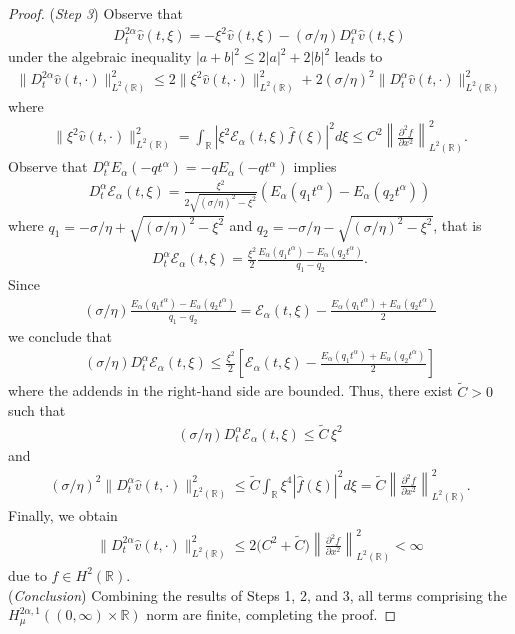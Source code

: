 \documentclass[10pt,a4paper]{amsart}
\begin{document}
\begin{proof}
({\it Step 3})
Observe that
\begin{align*}
D^{2\alpha}_t \hat{v}(t, \xi) = -\xi^2 \hat{v}(t, \xi) - (\sigma/\eta) D^\alpha_t \hat{v}(t, \xi)
\end{align*}
under the algebraic inequality $|a + b|^2 \le 2|a|^2 + 2|b|^2$ leads to
\begin{align*}
\|D^{2\alpha}_t \hat{v}(t, \cdot)\|^2_{L^2(\mathbb{R})} \le 2 \|\xi^2 \hat{v}(t, \cdot)\|^2_{L^2(\mathbb{R})} + 2(\sigma/\eta)^2 \|D^\alpha_t \hat{v}(t, \cdot)\|^2_{L^2(\mathbb{R})}
\end{align*}
where
\begin{align*}
\|\xi^2 \hat{v}(t, \cdot)\|^2_{L^2(\mathbb{R})} = \int_\mathbb{R} |\xi^2 \mathcal{E}_\alpha(t,\xi) \hat{f}(\xi) |^2 d\xi \leq C^2 \left\|\frac{\partial^2 f}{\partial x^2}\right\|^2_{L^2(\mathbb{R})}.
\end{align*}
Observe that $D^\alpha_t E_\alpha(- q t^\alpha)= - q E_\alpha(-q t^\alpha)$ implies 
\begin{align*}
D^\alpha_t \mathcal{E}_{\alpha}(t,\xi) = \frac{\xi^2}{2 \sqrt{(\sigma/\eta)^2 - \xi^2}} \left( E_\alpha(q_1 t^\alpha) - E_\alpha(q_2 t^\alpha) \right)
\end{align*}
where $q_1 = -\sigma/\eta + \sqrt{(\sigma/\eta)^2-\xi^2}$ and $q_2 = -\sigma/\eta - \sqrt{(\sigma/\eta)^2-\xi^2}$, that is
\begin{align*}
D^\alpha_t \mathcal{E}_{\alpha}(t,\xi) = \frac{\xi^2}{2} \frac{E_\alpha(q_1 t^\alpha) - E_\alpha(q_2 t^\alpha)}{q_1 -q_2}.
\end{align*}
Since
\begin{align*}
(\sigma/\eta) \frac{E_\alpha(q_1t^\alpha) - E_\alpha(q_2t^\alpha)}{q_1 - q_2} = \mathcal{E}_\alpha(t, \xi) - \frac{E_\alpha(q_1 t^\alpha) + E_\alpha(q_2 t^\alpha)}{2}
\end{align*}
we conclude that
\begin{align*}
(\sigma/\eta) D^\alpha_t \mathcal{E}_{\alpha}(t,\xi) \leq \frac{\xi^2}{2} \left[ \mathcal{E}_\alpha(t, \xi) - \frac{E_\alpha(q_1 t^\alpha) + E_\alpha(q_2 t^\alpha)}{2} \right]
\end{align*}
where the addends in the right-hand side are bounded. Thus, there exist $\tilde{C}>0$ such that 
\begin{align*}
(\sigma/\eta)  D^\alpha_t \mathcal{E}_{\alpha}(t,\xi) \leq \tilde{C}\, \xi^2
\end{align*}
and
\begin{align*}
(\sigma/\eta)^2 \|D^\alpha_t \hat{v}(t, \cdot)\|^2_{L^2(\mathbb{R})} \leq \tilde{C} \int_\mathbb{R} \xi^4 |\hat{f}(\xi)|^2 d\xi = \tilde{C} \left\|\frac{\partial^2 f}{\partial x^2}\right\|^2_{L^2(\mathbb{R})}.
\end{align*}
Finally, we obtain 
\begin{align*}
\|D^{2\alpha}_t \hat{v}(t, \cdot)\|^2_{L^2(\mathbb{R})} \le 2 \big(C^2 + \tilde{C} \big) \left\|\frac{\partial^2 f}{\partial x^2}\right\|^2_{L^2(\mathbb{R})} < \infty
\end{align*}
due to $f \in H^2(\mathbb{R})$.\\

({\it Conclusion})
Combining the results of Steps 1, 2, and 3, all terms comprising the $H^{2\alpha, 1}_\mu((0, \infty) \times \mathbb{R})$ norm are finite, completing the proof.
\end{proof}
\end{document}
